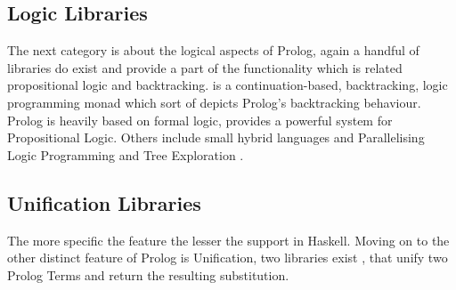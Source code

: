 \documentclass[thesis-solanki.tex]{subfiles}
\begin{document}
\begin{comment}
\begin{enumerate}
	\item Nano Prolog
	\item Prolog
	\item cspm-To-Prolog
	\item prolog-graph and prolog-graph-lib
	\item hswip,
	\\* \url{https://groups.google.com/forum/#!topic/haskell-cafe/3vmCuw7NlWE}
\end{enumerate}
\end{comment}

\subsection{Logic Libraries}

  The next category is about the logical aspects of Prolog, again a handful of libraries do exist and provide a
  part of the functionality which is related
  propositional logic and backtracking.
  \cite{logict-lib} is a continuation-based, backtracking, logic programming monad which sort of depicts
  Prolog's
  backtracking behaviour.
  Prolog is heavily based on formal logic, \cite{proplogic-lib} provides a powerful system for Propositional Logic.
  Others include small hybrid languages \cite{cflp-lib} and Parallelising Logic Programming and Tree Exploration
  \cite{logic-grows-on-trees-lib}.


\subsection{Unification Libraries}

The more specific the feature the lesser the support in Haskell. Moving on to the other distinct feature of Prolog is
Unification, two libraries exist \cite{unification-fd-lib}, \cite{cmu-lib} that unify two Prolog Terms and return the resulting
substitution.

\begin{comment}
\begin{enumerate}
	\item unification-fd
	\item cmu
\end{enumerate}
\end{comment}
\end{document}
